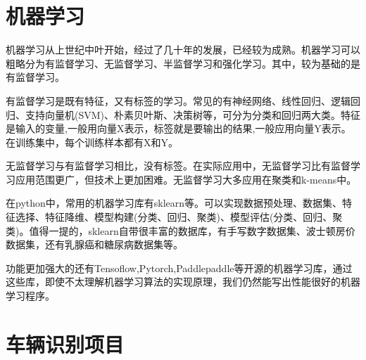\documentclass[UTF8]{ctexart}
\begin{document}
  \section{机器学习}
  机器学习从上世纪中叶开始，经过了几十年的发展，已经较为成熟。机器学习可以粗略分为有监督学习、无监督学习、半监督学习和强化学习。其中，较为基础的是有监督学习。\par
  有监督学习是既有特征，又有标签的学习。常见的有神经网络、线性回归、逻辑回归、支持向量机(SVM)、朴素贝叶斯、决策树等，可分为分类和回归两大类。特征是输入的变量,一般用向量X表示，标签就是要输出的结果,一般应用向量Y表示。在训练集中，每个训练样本都有X和Y。\par
  无监督学习与有监督学习相比，没有标签。在实际应用中，无监督学习比有监督学习应用范围更广，但技术上更加困难。无监督学习大多应用在聚类和k-means中。\par 
  在python中，常用的机器学习库有sklearn等。可以实现数据预处理、数据集、特征选择、特征降维、模型构建(分类、回归、聚类)、模型评估(分类、回归、聚类)。值得一提的，sklearn自带很丰富的数据库，有手写数字数据集、波士顿房价数据集，还有乳腺癌和糖尿病数据集等。\par 
  功能更加强大的还有Tensoflow,Pytorch,Paddlepaddle等开源的机器学习库，通过这些库，即使不太理解机器学习算法的实现原理，我们仍然能写出性能很好的机器学习程序。
  \newpage
  \section{车辆识别项目}
\end{document}
